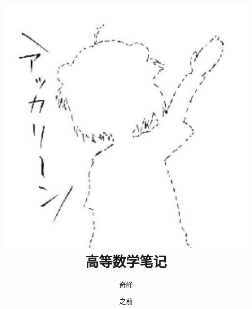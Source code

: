 \documentclass[oneside]{ctexbook}
\title{\includegraphics[scale=0.6]{1.jpg}\\ \textsf{高等数学笔记}}
\author{\href{https://qifengggg.github.io/}{奇峰}}
\date{之前}
\begin{document}
\theoremseparator{}
\newtheorem{def1}{定义}[section]
\newtheorem{theo1}{定理}[section]
\newtheorem{func1}{方法}[section]
\newtheorem{infer1}{推论}[section]
\newenvironment{proof}{\begin{itemize}\item \textbf{证明}
	
	}{\end{itemize}}


\newenvironment{Def}[1][\quad{}]{\begin{def1}\textbf{#1}}{\end{def1}}
\newenvironment{Theo}[1][\quad{}]{\begin{theo1}\textbf{#1}}{\end{theo1}}
\newenvironment{Func}[1][\quad{}]{\begin{func1}\textbf{#1}}{\end{func1}}
\newenvironment{Infer}[1][\quad{}]{\begin{infer1}\textbf{#1}}{\end{infer1}}
\newenvironment{Field}[1][\quad{}]{\noindent\newline\textbf{#1}}{}

\setlength{\parskip}{3pt}

\frontmatter
\maketitle
\hypertarget{Index}{}
\tableofcontents

\mainmatter






%
%

\end{document}
